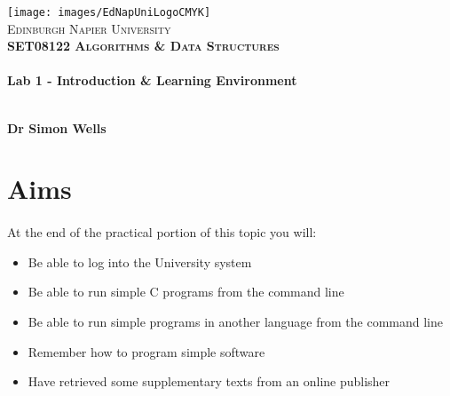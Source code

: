 \documentclass[10pt, a4paper, twosize]{article}
\begin{document}

\begin{titlepage}
\vspace*{5cm}
\begin{center}
\texttt{[image: images/EdNapUniLogoCMYK]}~\\[1cm]

\textsc{\Large Edinburgh Napier University}\\[1.5cm]

\textsc{\LARGE \bfseries SET08122 Algorithms \& Data Structures}\\[0.5cm]

\hrulefill \\[0.4cm]
{\huge \bfseries Lab 1 - Introduction \& Learning Environment \\[0.4cm] }
\hrulefill \\[1.5cm]

\begin{minipage}{0.4\textwidth}
\begin{flushleft} \large
\textbf{Dr Simon Wells} \\
\end{flushleft}
\end{minipage}

\vfill

\end{center}
\end{titlepage}




%

\section{Aims}
\paragraph{} At the end of the practical portion of this topic you will:

\begin{itemize}
\item Be able to log into the University system
\item Be able to run simple C programs from the command line
\item Be able to run simple programs in another language from the command line
\item Remember how to program simple software
\item Have retrieved some supplementary texts from an online publisher
\end{itemize}
\end{document}
